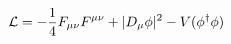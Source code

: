 \begin{equation} {\cal L}= -{1\over 4} F_{\mu
\nu}F^{\mu \nu}+ \vert D_\mu \phi\vert^2 -V(\phi^\dagger \phi)
\end{equation}

